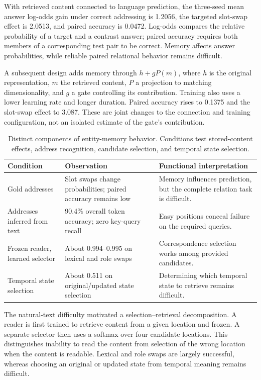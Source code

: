 With retrieved content connected to language prediction, the three-seed mean answer log-odds gain under correct addressing is 1.2056, the targeted slot-swap effect is 2.0513, and paired accuracy is 0.0472. Log-odds compares the relative probability of a target and a contrast answer; paired accuracy requires both members of a corresponding test pair to be correct. Memory affects answer probabilities, while reliable paired relational behavior remains difficult.

A subsequent design adds memory through $h+gP(m)$, where $h$ is the original representation, $m$ the retrieved content, $P$ a projection to matching dimensionality, and $g$ a gate controlling its contribution. Training also uses a lower learning rate and longer duration. Paired accuracy rises to 0.1375 and the slot-swap effect to 3.087. These are joint changes to the connection and training configuration, not an isolated estimate of the gate's contribution.

\begin{table}[htbp]
\caption{Distinct components of entity-memory behavior. Conditions test stored-content effects, address recognition, candidate selection, and temporal state selection.}
\label{tab:memory_layers}
\small
\begin{tabularx}{\linewidth}{@{}P{34mm}Y Y@{}}
\toprule Condition & Observation & Functional interpretation\\\midrule
Gold addresses & Slot swaps change probabilities; paired accuracy remains low & Memory influences prediction, but the complete relation task is difficult.\\
Addresses inferred from text & 90.4\% overall token accuracy; zero key-query recall & Easy positions conceal failure on the required queries.\\
Frozen reader, learned selector & About 0.994--0.995 on lexical and role swaps & Correspondence selection works among provided candidates.\\
Temporal state selection & About 0.511 on original/updated state selection & Determining which temporal state to retrieve remains difficult.\\
\bottomrule
\end{tabularx}
\end{table}

The natural-text difficulty motivated a selection--retrieval decomposition. A reader is first trained to retrieve content from a given location and frozen. A separate selector then uses a softmax over four candidate locations. This distinguishes inability to read the content from selection of the wrong location when the content is readable. Lexical and role swaps are largely successful, whereas choosing an original or updated state from temporal meaning remains difficult.

